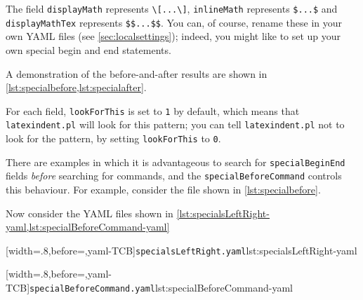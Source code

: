 	The field \texttt{displayMath} represents \lstinline!\[...\]!, \texttt{inlineMath} represents
	\lstinline!$...$! and \texttt{displayMathTex} represents \lstinline!$$...$$!. You can, of course,
	rename these in your own YAML files (see \vref{sec:localsettings}); indeed, you
	might like to set up your own special begin and end statements.

	A demonstration of the before-and-after results are shown in \cref{lst:specialbefore,lst:specialafter}.

	\begin{minipage}{.45\textwidth}
	\end{minipage}%
	\hfill
	\begin{minipage}{.45\textwidth}
	\end{minipage}

	For each field, \texttt{lookForThis} is set to \texttt{1} by default, which means that \texttt{latexindent.pl}
	will look for this pattern; you can tell \texttt{latexindent.pl} not to look for the pattern, by setting
	\texttt{lookForThis} to \texttt{0}.

	There are  examples in which it is advantageous to search for \texttt{specialBeginEnd} fields \emph{before}
	searching for commands, and the \texttt{specialBeforeCommand} controls this behaviour. For example, consider
	the file shown in \cref{lst:specialbefore}.


	Now consider the YAML files shown in \cref{lst:specialsLeftRight-yaml,lst:specialBeforeCommand-yaml}

	\begin{minipage}{.49\linewidth}
		[width=.8\linewidth,before=\centering,yaml-TCB]{\texttt{specialsLeftRight.yaml}}{lst:specialsLeftRight-yaml}
	\end{minipage}
	\hfill
	\begin{minipage}{.49\linewidth}
		[width=.8\linewidth,before=\centering,yaml-TCB]{\texttt{specialBeforeCommand.yaml}}{lst:specialBeforeCommand-yaml}
	\end{minipage}

